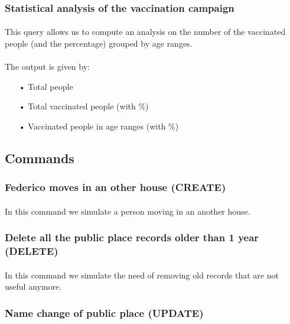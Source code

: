 \documentclass[a4paper,12pt]{article}
\begin{document}
\subsubsection{Statistical analysis of the vaccination campaign}
\paragraph{} This query allows us to compute an analysis on the number of the vaccinated people (and the percentage) grouped by age ranges.

\paragraph{} The output is given by: 
\begin{itemize}
\item[•] Total people
\item[•] Total vaccinated people (with \%)
\item[•] Vaccinated people in age ranges (with \%)

\end{itemize}

\subsection{Commands}
\subsubsection{Federico moves in an other house (CREATE)}
\paragraph{} In this command we simulate a person moving in an another house.


\subsubsection{Delete all the public place records older than 1 year (DELETE) }
\paragraph{} In this command we simulate the need of removing old records that are not useful anymore.


\subsubsection{Name change of public place (UPDATE)}
\end{document}
